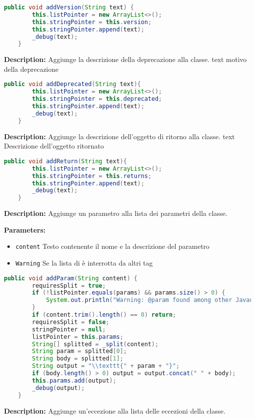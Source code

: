 \documentclass{article}
\begin{document}
\begin{lstlisting}[language=Java]
    public void addVersion(String text) {
        this.listPointer = new ArrayList<>();
        this.stringPointer = this.version;
        this.stringPointer.append(text);
        _debug(text);
    }
\end{lstlisting}
\textbf{Description:}  Aggiunge la descrizione della deprecazione alla classe. text motivo della deprecazione

\begin{lstlisting}[language=Java]
    public void addDeprecated(String text){
        this.listPointer = new ArrayList<>();
        this.stringPointer = this.deprecated;
        this.stringPointer.append(text);
        _debug(text);
    }
\end{lstlisting}
\textbf{Description:}  Aggiunge la descrizione dell'oggetto di ritorno alla classe. text Descrizione dell'oggetto ritornato

\begin{lstlisting}[language=Java]
    public void addReturn(String text){
        this.listPointer = new ArrayList<>();
        this.stringPointer = this.returns;
        this.stringPointer.append(text);
        _debug(text);
    }
\end{lstlisting}
\textbf{Description:}  Aggiunge un parametro alla lista dei parametri della classe. 

\textbf{Parameters:}
\begin{itemize}
  \item\texttt{content} Testo contenente il nome e la descrizione del parametro  
  \item\texttt{Warning} Se la lista di è interrotta da altri  tag
\end{itemize}

\begin{lstlisting}[language=Java]
    public void addParam(String content) {
        requiresSplit = true;
        if (!listPointer.equals(params) && params.size() > 0) {
            System.out.println("Warning: @param found among other Javadoc keywords. You should put all paramaters together.");
        }
        if (content.trim().length() == 0) return;
        requiresSplit = false;
        stringPointer = null;
        listPointer = this.params;
        String[] splitted = _split(content);
        String param = splitted[0];
        String body = splitted[1];
        String output = "\\texttt{" + param + "}";
        if (body.length() > 0) output = output.concat(" " + body);
        this.params.add(output);
        _debug(output);
    }
\end{lstlisting}
\textbf{Description:}  Aggiunge un'eccezione alla lista delle eccezioni della classe. 
\end{document}
